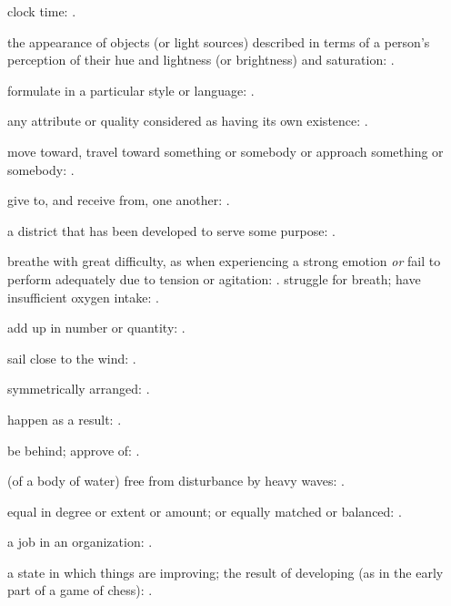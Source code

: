   clock time:   .

  the appearance of objects (or light sources) described in terms of a person's perception of their hue and lightness (or brightness) and saturation:   .

  formulate in a particular style or language:   .

  any attribute or quality considered as having its own existence: .

  move toward, travel toward something or somebody or approach something or somebody:   .

  give to, and receive from, one another:   .

  a district that has been developed to serve some purpose: .

  breathe with great difficulty, as when experiencing a strong emotion \textit{or} fail to perform adequately due to tension or agitation: . struggle for breath; have insufficient oxygen intake:   .

  add up in number or quantity:   .

  sail close to the wind:   .

  symmetrically arranged:   .

  happen as a result: .

  be behind; approve of:   .

  (of a body of water) free from disturbance by heavy waves:   .

  equal in degree or extent or amount; or equally matched or balanced:   .

  a job in an organization:   .

  a state in which things are improving; the result of developing (as in the early part of a game of chess): .

